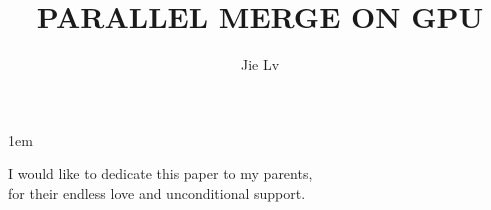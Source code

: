 \documentclass[fullpage,tocnosub,noragright,centerchapter, 12pt, mixcasechap]{uiucecethesis09}
\title{PARALLEL MERGE ON GPU}
\author{Jie Lv}
\begin{document}
\graphicspath{{all_figures/}}

%

%


\newif\ifsubmit
\submitfalse
\ifsubmit
    \newcommand{\liwen}[1]{}
    \newcommand{\wenmei}[1]{}
    \newcommand{\Wenmei}[1]{}
    \newcommand{\jie}[1]{}
    \newcommand{\todo}[1]{}
\else
    \newcommand{\liwen}[1]{[{\color{gray}LWC: #1}]}
    \newcommand{\wenmei}[1]{[{\color{gray}WMH: #1}]}
    \newcommand{\Wenmei}[1]{[{\color{gray}WMH: #1}]}
    \newcommand{\jie}[1]{[{\color{gray}JL: #1}]}
    \newcommand{\todo}[1]{[{\color{red}TODO: #1}]}
\fi


\maketitle

\parindent 1em%

\frontmatter

%
\begin{abstract}

\end{abstract}


%
\begin{dedication}
I would like to dedicate this paper to my parents, \\
for their endless love and unconditional support.
\end{dedication}

%
%

%
\tableofcontents

%
\end{document}
